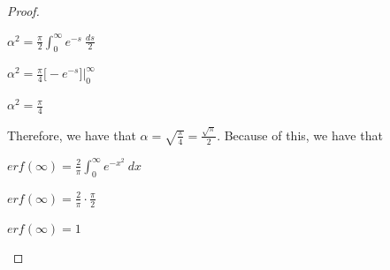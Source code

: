 \documentclass[12pt, executivepaper]{article}
\begin{document}
\begin{flushleft}
\begin{proof}
\begin{center}

$\alpha^2=\frac{\pi}{2} \int_{0}^{\infty} e^{-s} \ \frac{ds}{2}$

\vspace{2mm}

$\alpha^2=\frac{\pi}{4} \bigg[-e^{-s}\bigg]\Big|_{0}^{\infty}$

\vspace{2mm}

$\alpha^2=\frac{\pi}{4}$

\end{center}

Therefore, we have that $\alpha=\sqrt{\frac{\pi}{4}}=\frac{\sqrt{\pi}}{2}$. Because of this, we have that

\begin{center}

$erf(\infty)=\frac{2}{\pi} \int_{0}^{\infty} e^{-x^{2}} \ dx$

\vspace{2mm}

$erf(\infty)=\frac{2}{\pi} \cdot \frac{\pi}{2}$

\vspace{2mm}

$erf(\infty)=1$

\end{center}

\end{proof}

\end{flushleft}

\pagebreak

\vspace*{-40mm}
\end{document}
